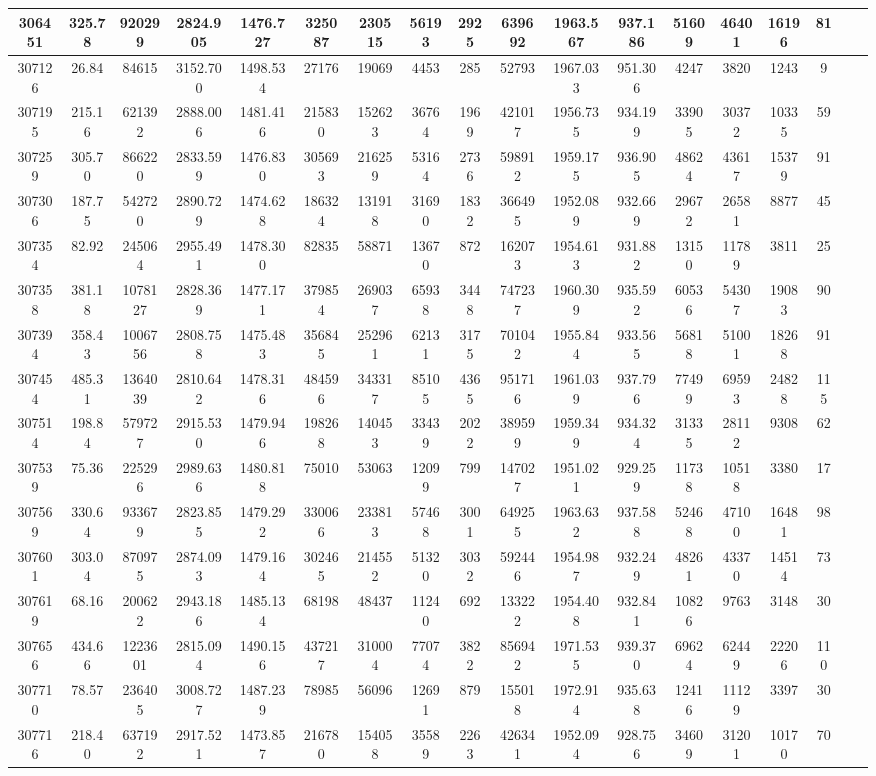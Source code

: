 \documentclass[10pt]{extarticle}
\begin{document}
\begin{longtable}{|c|c|c|c|c|c|c|c|c|c|c|c|c|c|c|c|c|c|}
\hline 
306451&325.78&920299&2824.905&1476.727&325087&230515&56193&2925&639692&1963.567&937.186&51609&46401&16196&81 \\ 
\hline 
307126&26.84&84615&3152.700&1498.534&27176&19069&4453&285&52793&1967.033&951.306&4247&3820&1243&9 \\ 
\hline 
307195&215.16&621392&2888.006&1481.416&215830&152623&36764&1969&421017&1956.735&934.199&33905&30372&10335&59 \\ 
\hline 
307259&305.70&866220&2833.599&1476.830&305693&216259&53164&2736&598912&1959.175&936.905&48624&43617&15379&91 \\ 
\hline 
307306&187.75&542720&2890.729&1474.628&186324&131918&31690&1832&366495&1952.089&932.669&29672&26581&8877&45 \\ 
\hline 
307354&82.92&245064&2955.491&1478.300&82835&58871&13670&872&162073&1954.613&931.882&13150&11789&3811&25 \\ 
\hline 
307358&381.18&1078127&2828.369&1477.171&379854&269037&65938&3448&747237&1960.309&935.592&60536&54307&19083&90 \\ 
\hline 
307394&358.43&1006756&2808.758&1475.483&356845&252961&62131&3175&701042&1955.844&933.565&56818&51001&18268&91 \\ 
\hline 
307454&485.31&1364039&2810.642&1478.316&484596&343317&85105&4365&951716&1961.039&937.796&77499&69593&24828&115 \\ 
\hline 
307514&198.84&579727&2915.530&1479.946&198268&140453&33439&2022&389599&1959.349&934.324&31335&28112&9308&62 \\ 
\hline 
307539&75.36&225296&2989.636&1480.818&75010&53063&12099&799&147027&1951.021&929.259&11738&10518&3380&17 \\ 
\hline 
307569&330.64&933679&2823.855&1479.292&330066&233813&57468&3001&649255&1963.632&937.588&52468&47100&16481&98 \\ 
\hline 
307601&303.04&870975&2874.093&1479.164&302465&214552&51320&3032&592446&1954.987&932.249&48261&43370&14514&73 \\ 
\hline 
307619&68.16&200622&2943.186&1485.134&68198&48437&11240&692&133222&1954.408&932.841&10826&9763&3148&30 \\ 
\hline 
307656&434.66&1223601&2815.094&1490.156&437217&310004&77074&3822&856942&1971.535&939.370&69624&62449&22206&110 \\ 
\hline 
307710&78.57&236405&3008.727&1487.239&78985&56096&12691&879&155018&1972.914&935.638&12416&11129&3397&30 \\ 
\hline 
307716&218.40&637192&2917.521&1473.857&216780&154058&35589&2263&426341&1952.094&928.756&34609&31201&10170&70 \\ 

\end{longtable}
\end{document}
